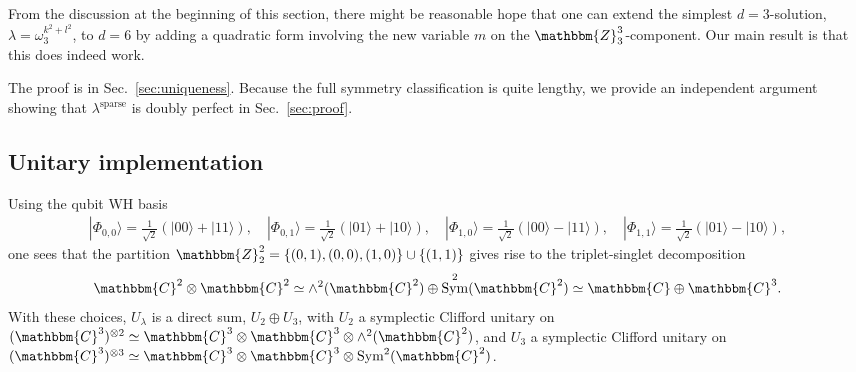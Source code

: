 \documentclass[aps,nofootinbib,floatfix,a4paper]{revtex4}
\newcommand{\sparse}{^\mathrm{sparse}}
\newcommand{\1}{\mbox{$\mathbf{1}$}}
\def\ZZ{\mathbbm{Z}}
\def\CC{\mathbbm{C}}
\DeclareMathOperator{\Sym}{Sym}
\begin{document}
From the discussion at the beginning of this section, there might be reasonable hope that one can extend the simplest $d=3$-solution, $\lambda=\omega_3^{k^2+l^2}$, to $d=6$ by adding a quadratic form involving the new variable $m$ on the $\ZZ_3^3$-component.
Our main result is that this does indeed work.

\mainthm*

The proof is in Sec.~\ref{sec:uniqueness}.
Because the full symmetry classification is quite lengthy, 
we provide an independent argument showing that $\lambda\sparse$ is doubly perfect in Sec.~\ref{sec:proof}.

\subsection{Unitary implementation}
\label{sec:unitaries}

Using the qubit WH basis
\begin{align*}
	|\Phi_{0,0}\rangle = \frac1{\sqrt{2}}(|00\rangle + |11\rangle), 
	\quad
	|\Phi_{0,1}\rangle = \frac1{\sqrt{2}}(|01\rangle + |10\rangle), 
	\quad
	|\Phi_{1,0}\rangle = \frac1{\sqrt{2}}(|00\rangle - |11\rangle), 
	\quad							 
	|\Phi_{1,1}\rangle = \frac1{\sqrt{2}}(|01\rangle - |10\rangle), %
\end{align*}
one sees that the partition $\ZZ_2^2= \{(0,1), (0,0), (1,0)\} \cup \{ (1,1) \}$ gives rise to the triplet-singlet decomposition
\begin{align*}
	\CC^2\otimes \CC^2 \simeq \wedge^2(\CC^2) \oplus \Sym^2(\CC^2) \simeq \CC \oplus \CC^3.
\end{align*}
With these choices, $U_{\lambda}$ 
is a direct sum, $U_{2}\oplus U_3$, with $U_2$ a symplectic Clifford unitary on
$(\CC^3)^{\otimes 2} \simeq \CC^3\otimes\CC^3\otimes\wedge^2(\CC^2)$,
and $U_3$ a symplectic Clifford unitary on
$(\CC^3)^{\otimes 3} \simeq \CC^3\otimes\CC^3\otimes\Sym^2(\CC^2)$.
\end{document}
